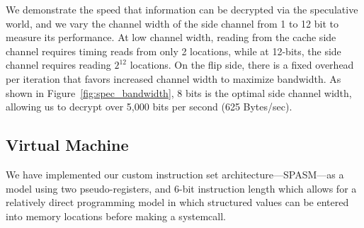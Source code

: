 We demonstrate the speed that information can be decrypted via the speculative
world, and we vary the channel width of the side channel from 1 to 12 bit to
measure its performance. At low channel width, reading from the cache side
channel requires timing reads from only 2 locations, while at 12-bits, the side
channel requires reading $2^{12}$ locations. On the flip side, there is a fixed
overhead per iteration that favors increased channel width to maximize
bandwidth. As shown in Figure~\ref{fig:spec_bandwidth}, 8 bits is the optimal
side channel width, allowing us to decrypt over 5,000 bits per second (625
Bytes/sec).



\FigSpecBandwidth

\subsection{Virtual Machine}
\label{subsec:spasm}


We have implemented our custom instruction set architecture---SPASM---as a model
using two pseudo-registers, and
6-bit instruction length which allows for a relatively direct programming model
in which structured values can be entered into memory locations before making
a systemcall.


%

